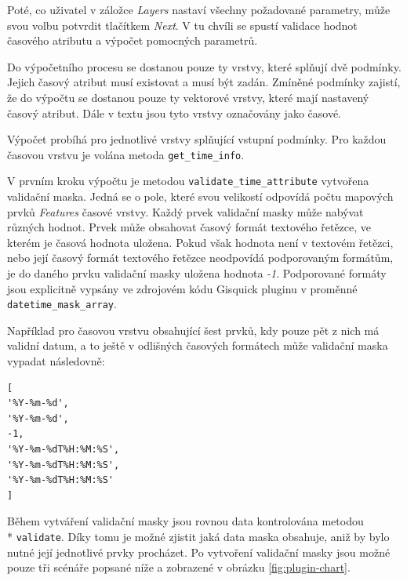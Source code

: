 Poté, co uživatel v záložce \textit{Layers} nastaví všechny požadované
parametry, může svou volbu potvrdit tlačítkem \textit{Next}. V tu chvíli se
spustí validace hodnot časového atributu a výpočet pomocných parametrů. 

Do výpočetního procesu se dostanou pouze ty vrstvy, které splňují dvě
podmínky. Jejich časový atribut musí existovat a musí být zadán. 
Zmíněné podmínky zajistí, že do výpočtu se dostanou pouze ty vektorové vrstvy,
které mají nastavený časový atribut. Dále v textu jsou tyto vrstvy
označovány jako časové.

Výpočet probíhá pro jednotlivé vrstvy splňující vstupní podmínky.
Pro každou časovou vrstvu je volána metoda \verb|get_time_info|.

V prvním kroku výpočtu je metodou
\verb|validate_time_attribute| vytvořena validační maska. Jedná se o pole,
které svou velikostí odpovídá počtu mapových prvků \textit{Features}
časové vrstvy. Každý prvek validační masky může nabývat různých
hodnot. Prvek může obsahovat časový formát textového řetězce, ve
kterém je časová hodnota uložena. Pokud však hodnota není v textovém
řetězci, nebo její časový formát textového řetězce neodpovídá
podporovaným formátům, je do daného prvku validační masky uložena
hodnota \textit{-1}. Podporované formáty jsou explicitně vypsány ve
zdrojovém kódu Gisquick pluginu v proměnné \verb|datetime_mask_array|.

Například pro časovou vrstvu obsahující šest prvků, kdy pouze pět
z nich má validní datum, a to ještě v odlišných časových formátech
může validační maska vypadat následovně:

\begin{verbatim}
[
'%Y-%m-%d',
'%Y-%m-%d',
-1,
'%Y-%m-%dT%H:%M:%S',
'%Y-%m-%dT%H:%M:%S',
'%Y-%m-%dT%H:%M:%S'
]
\end{verbatim}

Během vytváření validační masky jsou rovnou data kontrolována metodou
\\* \verb|validate|. Díky tomu je možné zjistit jaká data maska obsahuje,
aniž by bylo nutné její jednotlivé prvky procházet. Po vytvoření validační masky
jsou možné pouze tři scénáře popsané níže a zobrazené v obrázku
\ref{fig:plugin-chart}.

